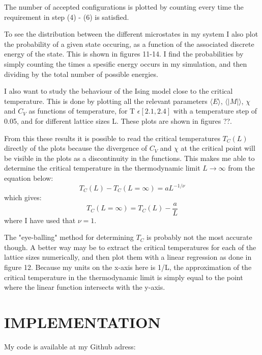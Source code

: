 \documentclass[twocolumn]{article}
\begin{document}
The number of accepted configurations is plotted by counting every time the requirement in step (4) - (6) is satisfied.\newline

To see the distribution between the different microstates in my system I also plot the probability of a given state occuring, as a function of the associated discrete energy of the state. This is shown in figures 11-14. I find the probabilities by simply counting the times a spesific energy occurs in my simulation, and then dividing by the total number of possible energies.\newline

I also want to study the behaviour of the Ising model close to the  critical temperature. This is done by plotting all the relevant parameters $\langle E \rangle$, $\langle |M| \rangle$, $\chi$ and $C_V$ as functions of temperature, for T $\epsilon[2.1, 2.4]$ with a temperature step of 0.05, and for different lattice sizes L. These plots are shown in figures ??.\newline

From this these results it is possible to read the critical temperatures $T_C(L)$ directly of the plots because the divergence of $C_V$ and $\chi$ at the critical point will be visible in the plots as a discontinuity in the functions.\newline
This makes me able to determine the critical temperature in the thermodynamic limit $L \rightarrow \infty$ from the equation below:
\begin{equation}
    T_C(L) - T_C(L=\infty) = aL^{-1/\nu}
\end{equation}
which gives:
\begin{equation}
    T_C(L=\infty) = T_C(L) - \frac{a}{L}
\end{equation}
where I have used that $\nu = 1$.\newline

The "eye-balling" method for determining $T_C$ is probably not the most accurate though. A better way may be to extract the critical temperatures for each of the lattice sizes numerically, and then plot them with a linear regression as done in figure 12. Because my units on the x-axis here is 1/L, the approximation of the critical temperature in the thermodynamic limit is simply equal to the point where the linear function intersects with the y-axis.

\section{IMPLEMENTATION}
My code is available at my Github adress:\newline
\end{document}
